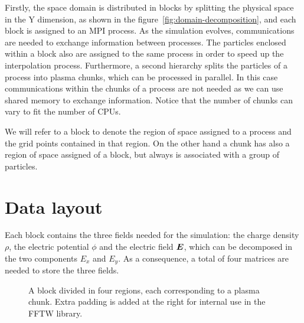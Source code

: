 Firstly, the space domain is distributed in blocks by splitting the physical 
space in the Y dimension, as shown in the figure~\ref{fig:domain-decomposition}, 
and each block is assigned to an MPI process. As the simulation evolves, 
communications are needed to exchange information between processes. The 
particles enclosed within a block also are assigned to the same process in order 
to speed up the interpolation process. Furthermore, a second hierarchy splits 
the particles of a process into plasma chunks, which can be processed in 
parallel. In this case communications within the chunks of a process are not 
needed as we can use shared memory to exchange information. Notice that the 
number of chunks can vary to fit the number of CPUs.

We will refer to a block to denote the region of space assigned to a process and 
the grid points contained in that region. On the other hand a chunk has also a 
region of space assigned of a block, but always is associated with a group of 
particles.

\section{Data layout}

Each block contains the three fields needed for the simulation: the charge 
density $\rho$, the electric potential $\phi$ and the electric field $\bm{E}$, which 
can be decomposed in the two components $E_x$ and $E_y$. As a consequence, a 
total of four matrices are needed to store the three fields.

\begin{figure}[h]%
\centering
{}
\caption{A block divided in four regions, each corresponding to a plasma chunk.  
Extra padding is added at the right for internal use in the FFTW library.}
\label{fig:block}
\end{figure}%

